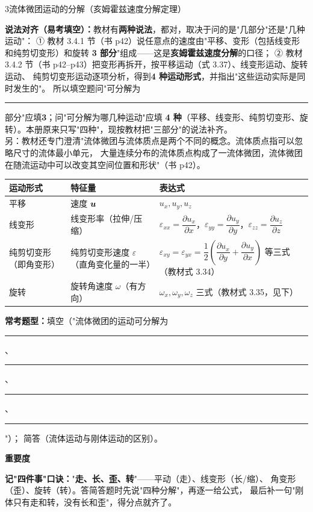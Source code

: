 \begin{kaodian}{3}{流体微团运动的分解（亥姆霍兹速度分解定理）}
\begin{tishi}
\textbf{说法对齐（易考填空）：}教材有\textbf{两种说法}，都对，取决于问的是"几部分"还是"几种运动"：
① 教材 3.4.1 节（书 p42）说任意点的速度由"平移、变形（包括线变形和纯剪切变形）和旋转
\textbf{3 部分}"组成——这是\textbf{亥姆霍兹速度分解}的口径；
② 教材 3.4.2 节（书 p42--p43）把变形再拆开，按平移运动（式 3.37）、线变形运动、旋转运动、
纯剪切变形运动逐项分析，得到\textbf{4 种运动形式}，并指出"这些运动实际是同时发生的"。
所以填空题问"可分解为\rule{2cm}{0.4pt}部分"应填\textbf{3}；问"可分解为哪几种运动"应填
\textbf{4 种}（平移、线变形、纯剪切变形、旋转）。本册原来只写"四种"，现按教材把"三部分"的说法补齐。\\
另：教材还专门澄清"流体微团与流体质点是两个不同的概念。流体质点指可以忽略尺寸的流体最小单元，
大量连续分布的流体质点构成了一流体微团，流体微团在随流运动中可以改变其空间位置和形状"（书 p42）。
\end{tishi}

\begin{center}
\begin{tabularx}{\textwidth}{@{}lXX@{}}
\toprule
运动形式 & 特征量 & 表达式 \\
\midrule
平移 & 速度 $\bm{u}$ & $u_x,u_y,u_z$ \\
线变形 & 线变形率（拉伸/压缩） & $\varepsilon_{xx}=\dfrac{\partial u_x}{\partial x}$，$\varepsilon_{yy}=\dfrac{\partial u_y}{\partial y}$，$\varepsilon_{zz}=\dfrac{\partial u_z}{\partial z}$ \\
纯剪切变形（即角变形） & 纯剪切变形速度 $\varepsilon$（直角变化量的一半） & $\varepsilon_{xy}=\varepsilon_{yx}=\dfrac{1}{2}\!\left(\dfrac{\partial u_x}{\partial y}+\dfrac{\partial u_y}{\partial x}\right)$ 等三式（教材式 3.34） \\
旋转 & 旋转角速度 $\omega$（有方向） & $\omega_x,\omega_y,\omega_z$ 三式（教材式 3.35，见下） \\
\bottomrule
\end{tabularx}
\end{center}

\textbf{常考题型：}填空（"流体微团的运动可分解为\rule{1.4cm}{0.4pt}、\rule{1.4cm}{0.4pt}、\rule{1.4cm}{0.4pt}、\rule{1.4cm}{0.4pt}"）；
简答（流体运动与刚体运动的区别）。

\textbf{重要度 }\quad{}\quad{}

\begin{banfa}
\textbf{记"四件事"口诀：}"\textbf{走、长、歪、转}"——平动（走）、线变形（长/缩）、
角变形（歪）、旋转（转）。答简答题时先说"四种分解"，再逐一给公式，
最后补一句"刚体只有走和转，没有长和歪"，得分点就齐了。
\end{banfa}
\end{kaodian}

